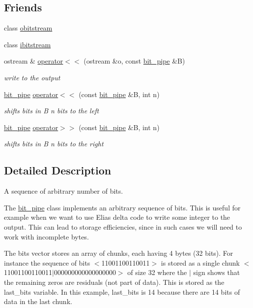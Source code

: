 \subsection*{Friends}
\begin{DoxyCompactItemize}
\item 
class \hyperlink{classbit__pipe_a8f65a774c3f7ab2392033a7cf4a170ad}{obitstream}
\item 
class \hyperlink{classbit__pipe_ad424cca57ffb12b4cd748da4dcfe7b41}{ibitstream}
\item 
ostream \& \hyperlink{classbit__pipe_a1fd08251d1f9f0ac5e24f3e90962f59a}{operator$<$$<$} (ostream \&o, const \hyperlink{classbit__pipe}{bit\+\_\+pipe} \&B)
\begin{DoxyCompactList}\small\item\em write to the output \end{DoxyCompactList}\item 
\hyperlink{classbit__pipe}{bit\+\_\+pipe} \hyperlink{classbit__pipe_a307267b689df83029a19dedf67cc4729}{operator$<$$<$} (const \hyperlink{classbit__pipe}{bit\+\_\+pipe} \&B, int n)
\begin{DoxyCompactList}\small\item\em shifts bits in B n bits to the left \end{DoxyCompactList}\item 
\hyperlink{classbit__pipe}{bit\+\_\+pipe} \hyperlink{classbit__pipe_a7de74a16947432771bc4001f8fd7079d}{operator$>$$>$} (const \hyperlink{classbit__pipe}{bit\+\_\+pipe} \&B, int n)
\begin{DoxyCompactList}\small\item\em shifts bits in B n bits to the right \end{DoxyCompactList}\end{DoxyCompactItemize}


\subsection{Detailed Description}
A sequence of arbitrary number of bits. 

The \hyperlink{classbit__pipe}{bit\+\_\+pipe} class implements an arbitrary sequence of bits. This is useful for example when we want to use Elias delta code to write some integer to the output. This can lead to storage efficiencies, since in such cases we will need to work with incomplete bytes.

The bits vector stores an array of chunks, each having 4 bytes (32 bits). For instance the sequence of bits $<$11001100110011$>$ is stored as a single chunk $<$11001100110011$\vert$000000000000000000$>$ of size 32 where the $\vert$ sign shows that the remaining zeros are residuals (not part of data). This is stored as the last\+\_\+bits variable. In this example, last\+\_\+bits is 14 because there are 14 bits of data in the last chunk. 

